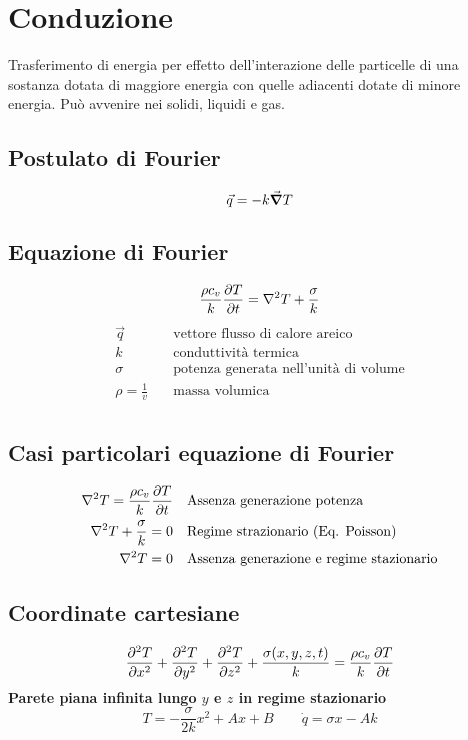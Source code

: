 \section{Conduzione}
Trasferimento di energia per effetto dell'interazione delle particelle di una sostanza dotata di maggiore energia con quelle adiacenti dotate di minore energia.
Può avvenire nei solidi, liquidi e gas.
\subsection{Postulato di Fourier}
\[ \vec{q} = - k \gradient{T} \]

\subsection{Equazione di Fourier}
\[ \frac{\rho c_v}{k} \pdv{T}{t} = \laplacian{T} + \frac{\sigma}{k} \]
\begin{align*}
\vec{q} & \quad \text{vettore flusso di calore areico} \\
k & \quad \text{conduttività termica} \\
\sigma & \quad \text{potenza generata nell'unità di volume} \\
\rho = \frac{1}{v} & \quad \text{massa volumica} \\
\end{align*}

\subsection{Casi particolari equazione di Fourier}
\begin{align*}
\laplacian{T} = \frac{\rho c_v}{k} \pdv{T}{t} & \quad \text{Assenza generazione potenza} \\
\laplacian{T} + \frac{\sigma}{k} = 0 & \quad \text{Regime strazionario (Eq. Poisson)}\\
\laplacian{T} = 0 & \quad \text{Assenza generazione e regime stazionario}\\
\end{align*}

\subsection{Coordinate cartesiane}
\[ \pdv[2]{T}{x} + \pdv[2]{T}{y} + \pdv[2]{T}{z} + \frac{\sigma(x,y,z,t)}{k} = \frac{\rho c_v}{k}\pdv{T}{t} \]
\textbf{Parete piana infinita lungo $y$ e $z$ in regime stazionario}\\
\[ T = -\frac{\sigma}{2k}x^2 + Ax + B \qquad \dot{q} = \sigma x - Ak \]

